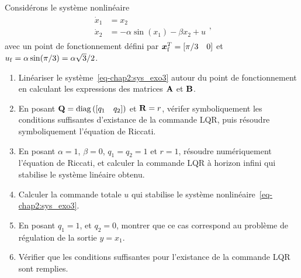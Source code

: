 \begin{exercise}
	Considérons le système nonlinéaire 
	\begin{align}\label{eq-chap2:sys_exo3}
	\begin{split}
	\dot{x}_1 &= x_2 \\
	\dot{x}_2 &= -\alpha \sin(x_1)-\beta x_2 +u
	\end{split},
	\end{align} avec un point de fonctionnement défini par $\bm{x}_{\rm f}^T = \left[{\pi}/{3} \quad 0\right]$  et $u_{\rm f} = \alpha\sin(\pi/3)=\alpha\sqrt{3}/2$.
	\begin{enumerate}
		\item Linéariser le système~\eqref{eq-chap2:sys_exo3} autour du point de fonctionnement en calculant les expressions des matrices $\mathbf{A}$ et $\mathbf{B}$.
		\item En posant $\mathbf{Q}=\operatorname{diag}\left(\left[q_1 \quad q_2\right]\right)$ et $\mathbf{R}=r$, vérifer symboliquement les conditions suffisantes d'existance de la commande LQR, puis résoudre symboliquement l'équation de Riccati.
		\item En posant $\alpha=1$, $\beta=0$, $q_1=q_2=1$ et $r=1$, résoudre numériquement l'équation de Riccati, et calculer la commande LQR à horizon infini qui stabilise le système linéaire obtenu.
		\item Calculer la commande totale $u$ qui stabilise le système nonlinéaire~\eqref{eq-chap2:sys_exo3}.
		\item En posant $q_1=1$, et $q_2=0$, montrer que ce cas correspond au problème de régulation de la sortie $y=x_1$.
		\item Vérifier que les conditions suffisantes pour l'existance de la commande LQR sont remplies.
	\end{enumerate}
\end{exercise}
